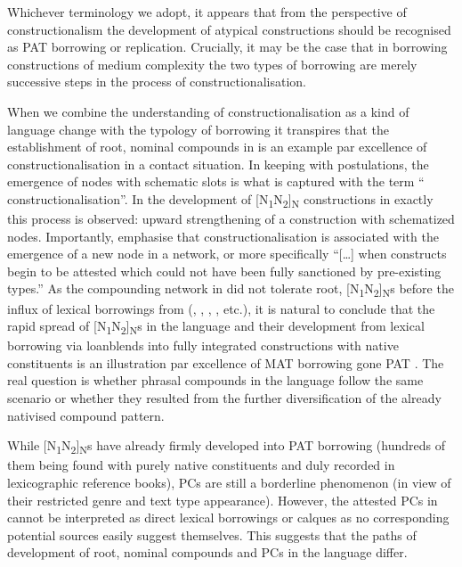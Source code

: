 \documentclass[output=paper]{LSP/langsci}
\begin{document}
Whichever terminology we adopt, it appears that from the perspective of constructionalism the development of atypical constructions should be recognised as PAT borrowing or  replication. Crucially, it may be the case that in borrowing constructions of medium complexity the two types of borrowing are merely successive steps in the process of constructionalisation. 

When we combine the understanding of constructionalisation as a kind of language change with the typology of borrowing it transpires that the establishment of root,  nominal compounds in  is an example par excellence of constructionalisation in a contact situation. In keeping with  postulations, the emergence of  nodes with schematic slots is what is captured with the term “ constructionalisation”. In the development of [N\textsubscript{1}N\textsubscript{2}]\textsubscript{N} constructions in  exactly this process is observed: upward strengthening of a construction with schematized nodes. Importantly, \citet[22]{Traugott2013} emphasise that constructionalisation is associated with the emergence of a new node in a  network, or more specifically “[…] when constructs begin to be attested which could not have been fully sanctioned by pre-existing  types.” As the compounding network in  did not tolerate root,  [N\textsubscript{1}N\textsubscript{2}]\textsubscript{N}s before the influx of lexical borrowings from  (\citealt{Brezinski2012}, \citealt{Krumova-Cvetkova2013}, \citealt{Murdarov1983}, \citealt{Radeva2007}, etc.), it is natural to conclude that the rapid spread of [N\textsubscript{1}N\textsubscript{2}]\textsubscript{N}s in the language and their development from lexical borrowing via loanblends into fully integrated constructions with native constituents is an illustration par excellence of MAT borrowing gone PAT \citep{Sakel2007}. The real question is whether phrasal compounds in the language follow the same scenario or whether they resulted from the further diversification of the already nativised compound pattern.

While [N\textsubscript{1}N\textsubscript{2}]\textsubscript{N}s have already firmly developed into PAT borrowing (hundreds of them being found with purely native constituents and duly recorded in lexicographic reference books), PCs are still a borderline phenomenon (in view of their restricted genre and text type appearance). However, the attested PCs in  cannot be interpreted as direct lexical borrowings or calques as no corresponding potential  sources easily suggest themselves. This suggests that the paths of development of root,  nominal compounds and PCs in the language differ.
\end{document}
